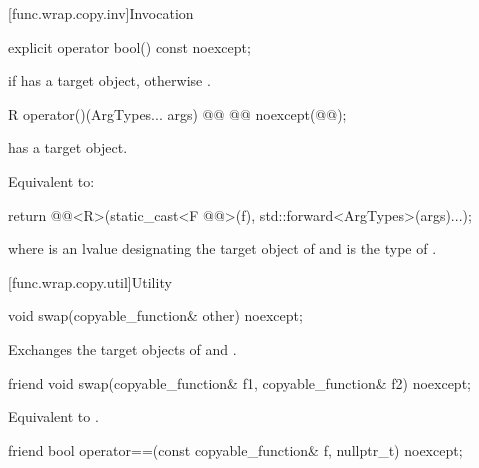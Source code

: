 [func.wrap.copy.inv]{Invocation}

%
\begin{itemdecl}
explicit operator bool() const noexcept;
\end{itemdecl}

\begin{itemdescr}
\pnum
\returns
{} if  has a target object, otherwise .
\end{itemdescr}

%
\begin{itemdecl}
R operator()(ArgTypes... args) @\cv{}@ @@ noexcept(@@);
\end{itemdecl}

\begin{itemdescr}
\pnum
\expects
{} has a target object.

\pnum
\effects
Equivalent to:
\begin{codeblock}
return @@<R>(static_cast<F @@>(f), std::forward<ArgTypes>(args)...);
\end{codeblock}
where  is an lvalue designating the target object of  and
 is the type of .
\end{itemdescr}

[func.wrap.copy.util]{Utility}

%
\begin{itemdecl}
void swap(copyable_function& other) noexcept;
\end{itemdecl}

\begin{itemdescr}
\pnum
\effects
Exchanges the target objects of  and .
\end{itemdescr}

%
\begin{itemdecl}
friend void swap(copyable_function& f1, copyable_function& f2) noexcept;
\end{itemdecl}

\begin{itemdescr}
\pnum
\effects
Equivalent to .
\end{itemdescr}

%
\begin{itemdecl}
friend bool operator==(const copyable_function& f, nullptr_t) noexcept;
\end{itemdecl}

